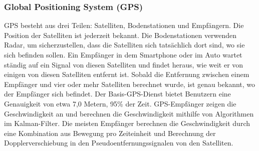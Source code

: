 %
%
%
%
%
%
%
%
\subsubsection{Global Positioning System (GPS)}

GPS besteht aus drei Teilen: Satelliten, Bodenstationen und Empfängern. Die Position der Satelliten ist jederzeit bekannt. Die Bodenstationen verwenden Radar, um sicherzustellen, dass die Satelliten sich tatsächlich dort sind, wo sie sich befinden sollen.
Ein Empfänger in dem Smartphone oder im Auto wartet ständig auf ein Signal von diesen Satelliten und findet heraus, wie weit er von einigen von diesen Satelliten entfernt ist. Sobald die Entfernung zwischen einem Empfänger und vier oder mehr Satelliten berechnet wurde, ist genau bekannt, wo der Empfänger sich befindet. Der Basis-GPS-Dienst bietet Benutzern eine Genauigkeit von etwa 7,0 Metern, 95\% der Zeit. GPS-Empfänger zeigen die Geschwindigkeit an und berechnen die Geschwindigkeit mithilfe von Algorithmen im Kalman-Filter. Die meisten Empfänger berechnen die Geschwindigkeit durch eine Kombination aus Bewegung pro Zeiteinheit und Berechnung der Dopplerverschiebung in den Pseudoentfernungssignalen von den Satelliten.\cite{Nasa2019}\cite{FAAGPS}\cite{YeazelGPS}

